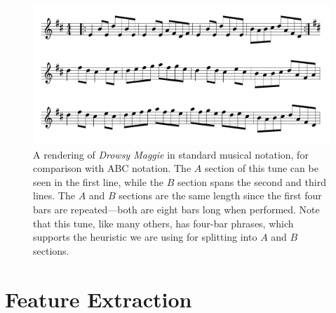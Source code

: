 \documentclass{article} %
\begin{document}
\begin{figure}[t]
  \begin{center}
    \includegraphics[width=5in]{drowsymaggie.png}
  \end{center}
  \caption{A rendering of \textit{Drowsy Maggie} in standard musical notation, for
  comparison with ABC notation. The $A$ section of this tune can be seen in the
first line, while the $B$ section spans the second and third lines. The $A$ and
$B$ sections are the same length since the first four bars are repeated---both
are eight bars long when performed. Note that this tune, like many others, has
four-bar phrases, which supports the heuristic we are using for splitting into
$A$ and $B$ sections.}
  \label{fig:drowsymusic}
\end{figure}

\section{Feature Extraction}

%
%
%
%
\end{document}
